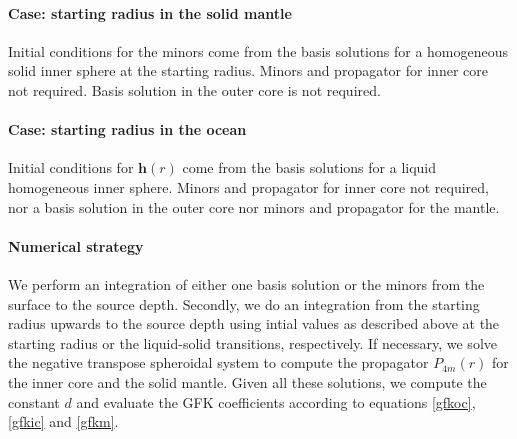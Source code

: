 \documentclass[12pt,a4paper]{article}
\begin{document}
\paragraph{Case: starting radius in the solid mantle}
Initial conditions for the minors come from the basis solutions for a homogeneous solid inner sphere at the starting radius. Minors and propagator for inner core not required. Basis solution in the outer core is not required.
%
\paragraph{Case: starting radius in the ocean}
Initial conditions for $\mathbf{h}(r)$ come from the basis solutions for a liquid homogeneous inner sphere. Minors and propagator for inner core not required, nor a basis solution in the outer core nor minors and propagator for the mantle.
%
\paragraph{Numerical strategy}
We perform an integration of either one basis solution or the minors from the surface to the source depth. Secondly, we do an integration from the starting radius upwards to the source depth using intial values as described above at the starting radius or the liquid-solid transitions, respectively. If necessary, we solve the negative transpose spheroidal system to compute the propagator $P_{4m}(r)$ for the inner core and the solid mantle. Given all these solutions, we compute the constant $d$ and evaluate the GFK coefficients according to equations \ref{gfkoc}, \ref{gfkic} and \ref{gfkm}.
%
\end{document}
